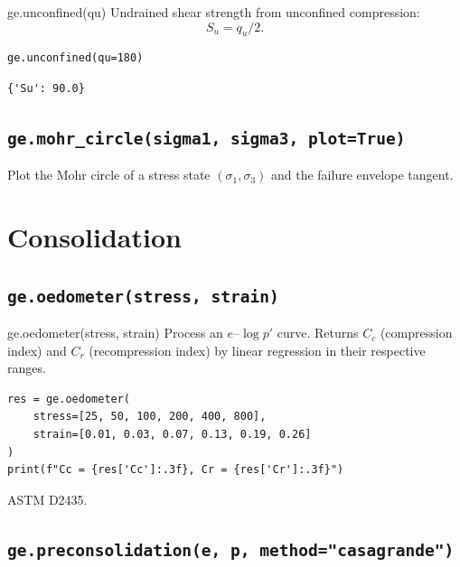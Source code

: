\documentclass[11pt,a4paper,openany]{book}
\begin{document}
\begin{funcbox}{ge.unconfined(qu)}
Undrained shear strength from unconfined compression:
\[
S_u = q_u / 2.
\]
\end{funcbox}

\begin{lstlisting}
ge.unconfined(qu=180)
\end{lstlisting}
\begin{lstlisting}[style=output]
{'Su': 90.0}
\end{lstlisting}

\subsection{\texttt{ge.mohr\_circle(sigma1, sigma3, plot=True)}}

Plot the Mohr circle of a stress state $(\sigma_1, \sigma_3)$ and
the failure envelope tangent.

\section{Consolidation}

\subsection{\texttt{ge.oedometer(stress, strain)}}

\begin{funcbox}{ge.oedometer(stress, strain)}
Process an $e$--$\log p'$ curve. Returns $C_c$ (compression index)
and $C_r$ (recompression index) by linear regression in their
respective ranges.
\end{funcbox}

\begin{lstlisting}
res = ge.oedometer(
    stress=[25, 50, 100, 200, 400, 800],
    strain=[0.01, 0.03, 0.07, 0.13, 0.19, 0.26]
)
print(f"Cc = {res['Cc']:.3f}, Cr = {res['Cr']:.3f}")
\end{lstlisting}

\begin{refbox}
ASTM D2435.
\end{refbox}

\subsection{\texttt{ge.preconsolidation(e, p, method="casagrande")}}
\end{document}
